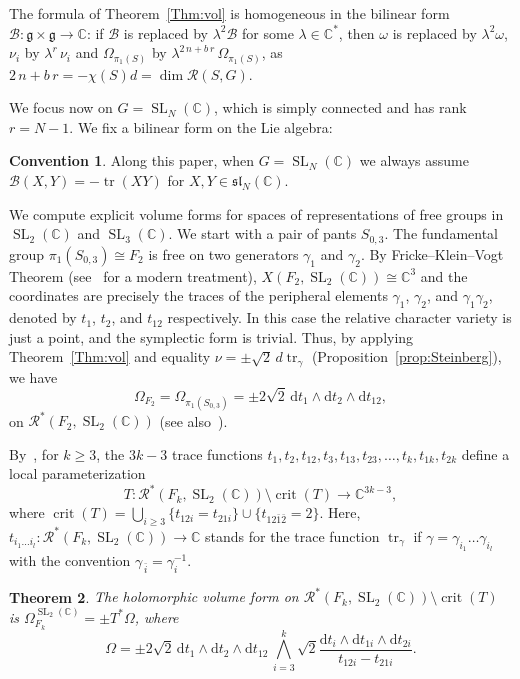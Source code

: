 \documentclass[11pt]{article}
\newtheorem{theo}{Theorem}[section]
\theoremstyle{definition}
\numberwithin{equation}{section}
\numberwithin{figure}{section}
\numberwithin{table}{section}
\DeclareMathOperator{\SL}{SL}
\DeclareMathOperator{\tr}{tr}
\DeclareMathOperator{\crit}{crit}
\newtheorem{conv}[theo]{Convention}}
\newcommand{\Bcal}{\mathcal{B}}
\newcommand{\Rcal}{\mathcal{R}}
\newcommand{\Cbb}{\mathbb{C}}
\newcommand{\gfrk}{\mathfrak{g}}
\newcommand{\slfrk}{\mathfrak{sl}}
\newcommand*{\dd}{\mathrm{d}}
\newcommand*\rG{r}
\begin{document}
The formula of Theorem~\ref{Thm:vol} is homogeneous in the bilinear form $\Bcal\colon\gfrk\times\gfrk\to\Cbb $: if $\Bcal$ is replaced by $\lambda^2\Bcal$ for some $\lambda\in\Cbb^* $, then $\omega$ is replaced by $\lambda^2\omega $, $\nu_i$ by $\lambda^\rG\, \nu_i$ and $ \Omega_{\pi_1(S)}$ by $ \lambda^{2\,n+ b\, r}\, \Omega_{\pi_1(S)}$, as $ {2\,n+b\,r}=-\chi(S)d=\dim \Rcal(S,G) $.



We focus now on $G=\SL_N (\Cbb)$, which is simply connected and has rank $r=N-1$. We fix a bilinear form on the Lie algebra:

\begin{conv}
Along this paper, when $G=\SL_N (\Cbb)$ we always assume $\Bcal(X,Y)=- \tr(XY)$ for $X,Y\in \slfrk_N (\Cbb)$.
\end{conv}


We compute explicit volume forms for spaces of representations of free groups in $\SL_2(\Cbb)$ and $\SL_3(\Cbb)$. We start with a pair of pants $S_{0,3}$. The fundamental group $\pi_1(S_{0,3})\cong F_2$ is free on two generators $\gamma_1$ and $\gamma_ 2$. By Fricke--Klein--Vogt Theorem \cite{Fricke, FrickeKlein, Vogt} (see~\cite{Goldman09,Magnus} for a modern treatment), $X(F_2, \SL_2(\Cbb))\cong\Cbb^3$ and the coordinates are precisely the traces of the peripheral elements $\gamma_1$, $\gamma_2$, and $\gamma_1\gamma_2$, denoted by $t_1$, $t_2$, and $t_{12}$ respectively. In this case the relative character variety is just a point, and the symplectic form is trivial. Thus, by applying Theorem~\ref{Thm:vol} and equality $
\nu=\pm\sqrt 2 \, d \tr_\gamma $ (Proposition~\ref{prop:Steinberg}), we have
\[
\Omega_{F_ 2} =\Omega_{\pi_1(S_{0,3})}=\pm 2\sqrt 2 \, \dd t_1\wedge \dd t_2\wedge \dd t_{12},
\]
on $\Rcal^*(F_2,\SL_2(\Cbb))$ (see also~\cite[4.3.1]{Marche2016}).


By~\cite{AcunaMontesinos}, for $k\!\geq\! 3$, the $3k-3$ trace functions $t_1,t_2,t_{12}, t_3,t_{13}, t_{23}, \dots, t_{k},t_{1k},t_{2k}$ define a local parameterization
\[
T\colon \Rcal^*(F_k,\SL_2(\Cbb)) \setminus \crit(T)
\to \Cbb^{3k-3},
\]
where $\crit(T) =\bigcup_{i\geq 3}\{ t_{12i}=t_{21i} \}\cup\{t_{12\bar1\bar2}=2\}$. Here, $t_{i_1\dots i_l}\colon \Rcal^*(F_k,\SL_2(\Cbb))\to\Cbb$ stands for the trace function $ \tr_\gamma$ if $\gamma = \gamma_{i_1}\dots\gamma_{i_l}$ with the convention $\gamma_{\,\bar i}=\gamma_i^{-1}$.

\begin{theo}\label{thm:F3SL2}
The holomorphic volume form on $\Rcal^*(F_k,\SL_2(\Cbb)) \setminus \crit(T)$ is $ \Omega_{F_k}^{\SL_2(\Cbb)}= \pm T^*\Omega$, where
\[
\Omega= \pm 2\sqrt{2}\, \dd t_1\wedge \dd t_2\wedge \dd t_{12} \, \bigwedge_{i=3}^k \sqrt{2} \frac{\dd t_i \wedge \dd t_{1i}\wedge \dd t_{2i} }{t_{12i}-t_{21i}}.
\]
\end{theo}
\end{document}
